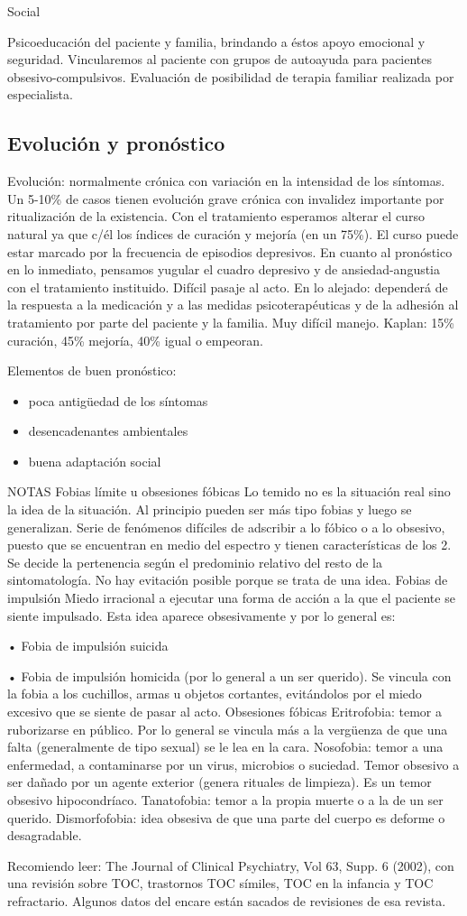 Social

Psicoeducación del paciente y familia, brindando a éstos apoyo emocional y seguridad. Vincularemos al paciente con grupos de autoayuda para pacientes obsesivo-compulsivos. Evaluación de posibilidad de terapia familiar realizada por especialista.

\subsection*{Evolución y pronóstico}

Evolución: normalmente crónica con variación en la intensidad de los síntomas. Un 5-10\% de casos tienen evolución grave crónica con invalidez importante por ritualización de la existencia. Con el tratamiento esperamos alterar el curso natural ya que c/él los índices de curación y mejoría (en un 75\%). El curso puede estar marcado por la frecuencia de episodios depresivos. En cuanto al pronóstico en lo inmediato, pensamos yugular el cuadro depresivo y de ansiedad-angustia con el tratamiento instituido. Difícil pasaje al acto. En lo alejado: dependerá de la respuesta a la medicación y a las medidas psicoterapéuticas y de la adhesión al tratamiento por parte del paciente y la familia. Muy difícil manejo. Kaplan: 15\% curación, 45\% mejoría, 40\% igual o empeoran.

Elementos de buen pronóstico:

\begin{itemize}
	\item poca antigüedad de los síntomas
	\item desencadenantes ambientales
	\item buena adaptación social
\end{itemize}

NOTAS Fobias límite u obsesiones fóbicas Lo temido no es la situación real sino la idea de la situación. Al principio pueden ser más tipo fobias y luego se generalizan. Serie de fenómenos difíciles de adscribir a lo fóbico o a lo obsesivo, puesto que se encuentran en medio del espectro y tienen características de los 2. Se decide la pertenencia según el predominio relativo del resto de la sintomatología. No hay evitación posible porque se trata de una idea. Fobias de impulsión Miedo irracional a ejecutar una forma de acción a la que el paciente se siente impulsado. Esta idea aparece obsesivamente y por lo general es:

• Fobia de impulsión suicida

• Fobia de impulsión homicida (por lo general a un ser querido). Se vincula con la fobia a los cuchillos, armas u objetos cortantes, evitándolos por el miedo excesivo que se siente de pasar al acto. Obsesiones fóbicas Eritrofobia: temor a ruborizarse en público. Por lo general se vincula más a la vergüenza de que una falta (generalmente de tipo sexual) se le lea en la cara. Nosofobia: temor a una enfermedad, a contaminarse por un virus, microbios o suciedad. Temor obsesivo a ser dañado por un agente exterior (genera rituales de limpieza). Es un temor obsesivo hipocondríaco. Tanatofobia: temor a la propia muerte o a la de un ser querido. Dismorfofobia: idea obsesiva de que una parte del cuerpo es deforme o desagradable.

Recomiendo leer: The Journal of Clinical Psychiatry, Vol 63, Supp. 6 (2002), con una revisión sobre TOC, trastornos TOC símiles, TOC en la infancia y TOC refractario. Algunos datos del encare están sacados de revisiones de esa revista.
\printbibliography[]